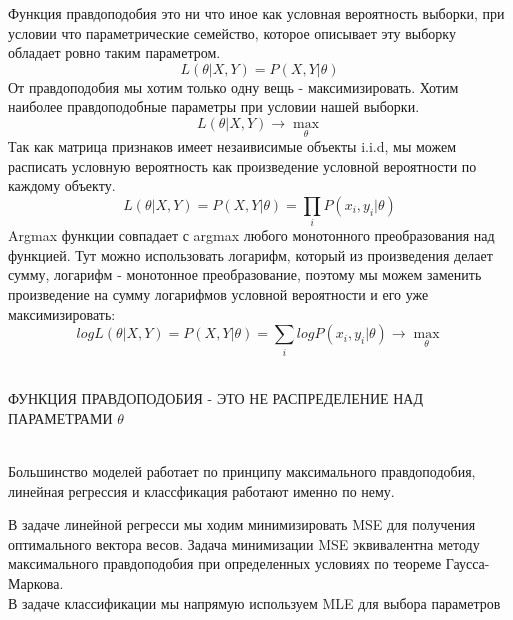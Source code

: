 Функция правдоподобия это ни что иное как условная вероятность выборки, при условии что
параметрические семейство, которое описывает эту выборку обладает ровно таким параметром.
$$L(\theta | X, Y ) = P(X, Y |\theta)$$
От правдоподобия мы хотим только одну вещь - максимизировать. Хотим наиболее правдоподобные параметры
при условии нашей выборки.
$$L(\theta | X, Y ) \rightarrow \underset{\theta}{\max}$$
Так как матрица признаков имеет незаивисимые объекты i.i.d, мы можем расписать условную вероятность
как произведение условной вероятности по каждому объекту.
$$L(\theta|X, Y ) = P(X, Y |\theta) = \prod\limits_i P(x_i, y_i |\theta)$$
Argmax функции совпадает с argmax любого монотонного преобразования над функцией. Тут можно использовать логарифм, который из произведения делает сумму, логарифм - монотонное преобразование, поэтому
мы можем заменить произведение на сумму логарифмов условной вероятности и его уже максимизировать:
$$log L(\theta|X, Y ) = P(X, Y |\theta) = \sum\limits_i log P(x
_i, y_i |\theta)  \rightarrow \underset{\theta}{\max}$$
\\
\begin{note}
ФУНКЦИЯ ПРАВДОПОДОБИЯ - ЭТО НЕ РАСПРЕДЕЛЕНИЕ НАД ПАРАМЕТРАМИ $\theta$

\end{note}

\begin{note}
\
\\

Большинство моделей работает по принципу максимального правдоподобия, линейная регрессия и классфикация работают именно по нему.

В задаче линейной регресси мы ходим минимизировать MSE для получения оптимального вектора весов. Задача минимизации MSE эквивалентна методу максимального правдоподобия при определенных условиях по теореме Гаусса-Маркова.
\\
В задаче классификации мы напрямую используем MLE для выбора параметров
\end{note}

